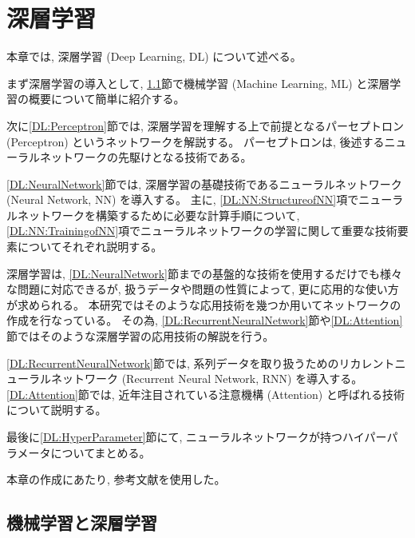 
\chapter{深層学習} \label{chap:DeepLearning}

本章では, 深層学習 (Deep Learning, DL) について述べる。

まず深層学習の導入として, \ref{DL:MachineandDeepLearning}節で機械学習 (Machine Learning, ML) と深層学習の概要について簡単に紹介する。

次に\ref{DL:Perceptron}節では, 深層学習を理解する上で前提となるパーセプトロン (Perceptron) というネットワークを解説する。
パーセプトロンは, 後述するニューラルネットワークの先駆けとなる技術である。

\ref{DL:NeuralNetwork}節では, 深層学習の基礎技術であるニューラルネットワーク (Neural Network, NN) を導入する。
主に, \ref{DL:NN:StructureofNN}項でニューラルネットワークを構築するために必要な計算手順について, \ref{DL:NN:TrainingofNN}項でニューラルネットワークの学習に関して重要な技術要素についてそれぞれ説明する。

深層学習は, \ref{DL:NeuralNetwork}節までの基盤的な技術を使用するだけでも様々な問題に対応できるが, 扱うデータや問題の性質によって, 更に応用的な使い方が求められる。
本研究ではそのような応用技術を幾つか用いてネットワークの作成を行なっている。
その為, \ref{DL:RecurrentNeuralNetwork}節や\ref{DL:Attention}節ではそのような深層学習の応用技術の解説を行う。

\ref{DL:RecurrentNeuralNetwork}節では, 系列データを取り扱うためのリカレントニューラルネットワーク (Recurrent Neural Network, RNN) を導入する。
\ref{DL:Attention}節では, 近年注目されている注意機構 (Attention) と呼ばれる技術について説明する。

最後に\ref{DL:HyperParameter}節にて, ニューラルネットワークが持つハイパーパラメータについてまとめる。

本章の作成にあたり, 参考文献\cite{ZeroDeepLearning1, ZeroDeepLearning2, PythonMLPrograming}を使用した。

\section{機械学習と深層学習} \label{DL:MachineandDeepLearning}

